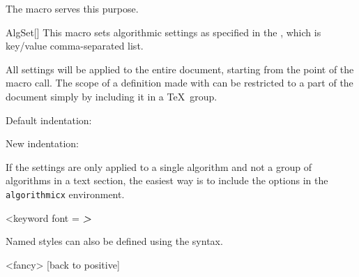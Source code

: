 \documentclass[a4paper, 11pt]{article}
\begin{document}
The  macro serves this purpose.

\begin{macro}{AlgSet}[]
    This macro sets algorithmic settings as specified in the , which is key/value comma-separated list.

    All settings will be applied to the entire document, starting from the point of the macro call. The scope of a definition made with  can be restricted to a part of the document simply by including it in a \TeX\ group.
\end{macro}

\begin{tcblisting}{}
    Default indentation:
    \begin{algorithmic}
        \EndIf
    \end{algorithmic}

    \medskip
    New indentation:
    \begingroup%
    \begin{algorithmic}
        \EndIf
    \end{algorithmic}
    \endgroup%
\end{tcblisting}

If the settings are only applied to a single algorithm and not a group of algorithms in a text section, the easiest way is to include the options in the \texttt{algorithmicx} environment.

\begin{tcblisting}{}
    \begin{algorithmic}<keyword font = \sffamily\bfseries\itshape>
        \EndIf
    \end{algorithmic}
\end{tcblisting}

Named styles can also be defined using the  syntax.

\begin{tcblisting}{}
    \begin{algorithmic}<fancy>
            [back to positive]
        \EndIf
    \end{algorithmic}
\end{tcblisting}
\end{document}
